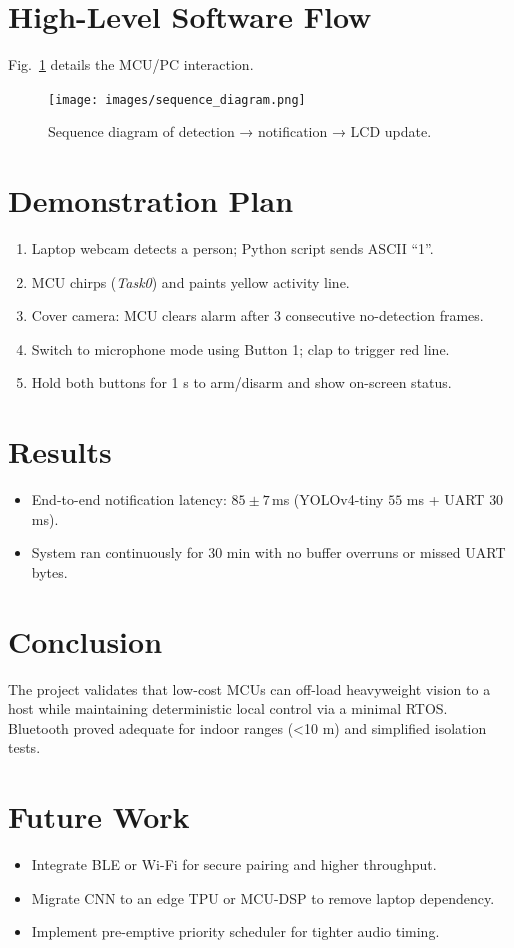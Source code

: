 \documentclass[11pt]{IEEEtran}
\begin{document}
\section{High-Level Software Flow}
Fig.~\ref{fig:seq} details the MCU/PC interaction.

\begin{figure}[t]
\centering
\texttt{[image: images/sequence\_diagram.png]}
\caption{Sequence diagram of detection → notification → LCD update.}
\label{fig:seq}
\end{figure}

\section{Demonstration Plan}
\begin{enumerate}
  \item Laptop webcam detects a person; Python script sends ASCII ``1''.
  \item MCU chirps (\textit{Task0}) and paints yellow activity line.
  \item Cover camera: MCU clears alarm after 3 consecutive no-detection frames.
  \item Switch to microphone mode using Button 1; clap to trigger red line.
  \item Hold both buttons for 1 s to arm/disarm and show on-screen status.
\end{enumerate}

\section{Results}
\begin{itemize}
  \item End-to-end notification latency: $85\pm 7\,$ms  
        (YOLOv4-tiny $55$ ms + UART $30$ ms).
  \item System ran continuously for 30 min with no buffer overruns
        or missed UART bytes.
\end{itemize}

\section{Conclusion}
The project validates that low-cost MCUs can off-load heavyweight vision
to a host while maintaining deterministic local control via a minimal
RTOS.  Bluetooth proved adequate for indoor ranges (\textless10 m) and
simplified isolation tests.

\section{Future Work}
\begin{itemize}
  \item Integrate BLE or Wi-Fi for secure pairing and higher throughput.
  \item Migrate CNN to an edge TPU or MCU-DSP to remove laptop
        dependency.
  \item Implement pre-emptive priority scheduler for tighter audio timing.
\end{itemize}
\end{document}
